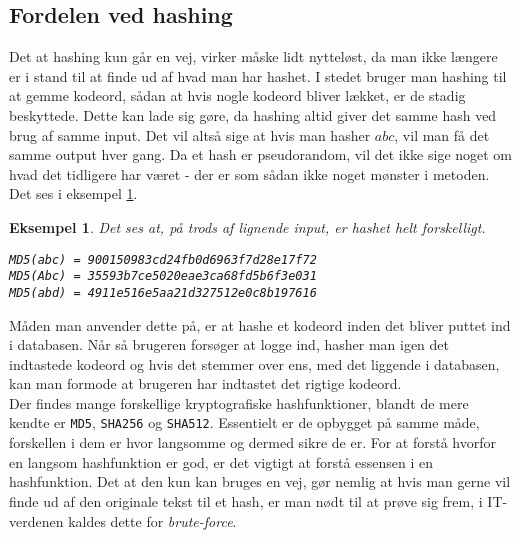 \documentclass[a4paper, 12pt]{article}
\theoremstyle{break}
\newtheorem{eks}[definition]{Eksempel}
\theoremstyle{breakline}
\begin{document}
    \subsection{Fordelen ved hashing}
    Det at hashing kun går en vej, virker måske lidt nytteløst, da man ikke længere er i stand til at finde ud af hvad man har hashet.
    I stedet bruger man hashing til at gemme kodeord, sådan at hvis nogle kodeord bliver lækket, er de stadig beskyttede.
    Dette kan lade sig gøre, da hashing altid giver det samme hash ved brug af samme input.
    Det vil altså sige at hvis man hasher \(abc\), vil man få det samme output hver gang.
    Da et hash er pseudorandom, vil det ikke sige noget om hvad det tidligere har været - der er som sådan ikke noget mønster i metoden.
    Det ses i eksempel \ref{eks:hash}.


    \begin{eks}
        Det ses at, på trods af lignende input, er hashet helt forskelligt.
        \begin{center}
            \texttt{MD5(abc) = 900150983cd24fb0d6963f7d28e17f72}\\
            \texttt{MD5(Abc) = 35593b7ce5020eae3ca68fd5b6f3e031}\\
            \texttt{MD5(abd) = 4911e516e5aa21d327512e0c8b197616}\\
        \end{center}
        \label{eks:hash}

    \end{eks}

    \noindent
    Måden man anvender dette på, er at hashe et kodeord inden det bliver puttet ind i databasen.
    Når så brugeren forsøger at logge ind, hasher man igen det indtastede kodeord og hvis det stemmer over ens, med det liggende i databasen, kan man formode at brugeren har indtastet det rigtige kodeord.
    \\

    Der findes mange forskellige kryptografiske hashfunktioner, blandt de mere kendte er \texttt{MD5}, \texttt{SHA256} og \texttt{SHA512}.
    Essentielt er de opbygget på samme måde, forskellen i dem er hvor langsomme og dermed sikre de er.
    For at forstå hvorfor en langsom hashfunktion er god, er det vigtigt at forstå essensen i en hashfunktion.
    Det at den kun kan bruges en vej, gør nemlig at hvis man gerne vil finde ud af den originale tekst til et hash, er man nødt til at prøve sig frem, i IT-verdenen kaldes dette for \emph{brute-force}.
\end{document}
